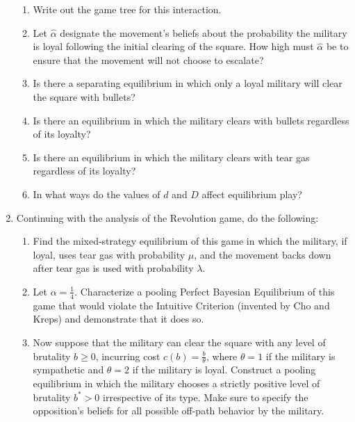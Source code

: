 \documentclass[fleqn,titlepage,12pt]{article}
\begin{document}
\begin{enumerate}
\begin{enumerate}
\item Write out the game tree for this interaction.

\item Let $\hat{\alpha}$ designate the movement's beliefs about the
probability the military is loyal following the initial clearing of the
square. How high must $\hat{\alpha}$ be to ensure that the movement will not
choose to escalate?

\item Is there a separating equilibrium in which only a loyal military will
clear the square with bullets?

\item Is there an equilibrium in which the military clears with bullets
regardless of its loyalty?

\item Is there an equilibrium in which the military clears with tear gas
regardless of its loyalty?

\item In what ways do the values of $d$ and $D$ affect equilibrium play?
\end{enumerate}

\item Continuing with the analysis of the Revolution game, do the following:

\begin{enumerate}
\item Find the mixed-strategy equilibrium of this game in which the
military, if loyal, uses tear gas with probability $\mu $, and the movement
backs down after tear gas is used with probability $\lambda $.

\item Let $\alpha =\frac{1}{4}$. Characterize a pooling Perfect Bayesian
Equilibrium of this game that would violate the Intuitive Criterion
(invented by Cho and Kreps) and demonstrate that it does so.

\item Now suppose that the military can clear the square with any level of
brutality $b\geq 0$, incurring cost $c\left( b\right) =\frac{b}{\theta }$,
where $\theta =1$ if the military is sympathetic and $\theta =2$ if the
military is loyal. Construct a pooling equilibrium in which the military
chooses a strictly positive level of brutality $b^{\ast }>0$ irrespective of
its type. Make sure to specify the opposition's beliefs for all possible
off-path behavior by the military.
\end{enumerate}


\end{enumerate}
\end{document}
